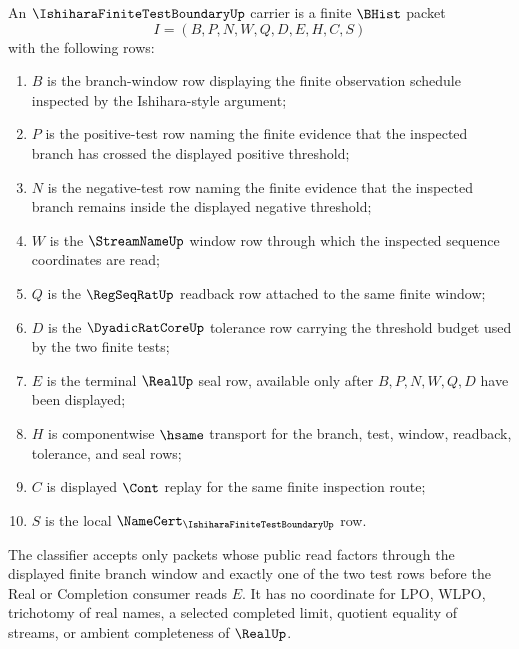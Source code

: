 \begin{definition}
\label{def:ishihara-finite-test-boundary-carrier}
An $\IshiharaFiniteTestBoundaryUp$ carrier is a finite $\BHist$ packet
$$
I=(B,P,N,W,Q,D,E,H,C,S)
$$
with the following rows:
\begin{enumerate}
\item $B$ is the branch-window row displaying the finite observation schedule inspected by the Ishihara-style argument;
\item $P$ is the positive-test row naming the finite evidence that the inspected branch has crossed the displayed positive threshold;
\item $N$ is the negative-test row naming the finite evidence that the inspected branch remains inside the displayed negative threshold;
\item $W$ is the $\StreamNameUp$ window row through which the inspected sequence coordinates are read;
\item $Q$ is the $\RegSeqRatUp$ readback row attached to the same finite window;
\item $D$ is the $\DyadicRatCoreUp$ tolerance row carrying the threshold budget used by the two finite tests;
\item $E$ is the terminal $\RealUp$ seal row, available only after $B,P,N,W,Q,D$ have been displayed;
\item $H$ is componentwise $\hsame$ transport for the branch, test, window, readback, tolerance, and seal rows;
\item $C$ is displayed $\Cont$ replay for the same finite inspection route;
\item $S$ is the local $\NameCert_{\IshiharaFiniteTestBoundaryUp}$ row.
\end{enumerate}
The classifier accepts only packets whose public read factors through the displayed finite branch window and exactly one of the two test rows before the Real or Completion consumer reads $E$. It has no coordinate for LPO, WLPO, trichotomy of real names, a selected completed limit, quotient equality of streams, or ambient completeness of $\RealUp$.
\end{definition}


